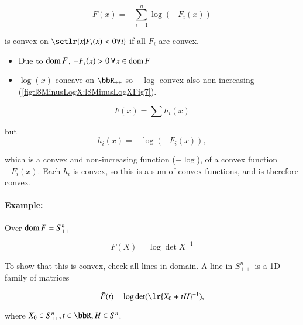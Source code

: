 \begin{equation}\label{eqn:convexOptimizationLecture8:300}
F(x) = - \sum_{i = 1}^n \log( -F_i(x) )
\end{equation}

is convex on \( \setlr{ x | F_i(x) < 0 \forall i } \) if all \( F_i \) are convex.

\begin{itemize}
\item Due to \( \operatorname{dom} F \), \( -F_i(x) > 0 \,\forall x \in \operatorname{dom} F \)
\item \( \log(x) \) concave on \( \bbR_{++} \) so \( -\log \) convex also non-increasing (\cref{fig:l8MinusLogX:l8MinusLogXFig7}).


\end{itemize}

\begin{dmath}\label{eqn:convexOptimizationLecture8:320}
F(x) = \sum h_i(x)
\end{dmath}

but
\begin{dmath}\label{eqn:convexOptimizationLecture8:340}
h_i(x) = -\log(-F_i(x)),
\end{dmath}

which is a convex and non-increasing function (\(-\log\)), of a convex function \( -F_i(x) \).  Each 
\( h_i \) is convex, so this is a sum of convex functions, and is therefore convex.

\paragraph{Example:}

Over \( \operatorname{dom} F = S^n_{++} \)

\begin{dmath}\label{eqn:convexOptimizationLecture8:360}
F(X) = \log \det X^{-1}
\end{dmath}

To show that this is convex, check all lines in domain.  A line in \( S^n_{++} \) is a 1D family of matrices

\begin{dmath}\label{eqn:convexOptimizationLecture8:380}
\tilde{F}(t) = \log \det( \lr{X_0 + t H}^{-1} ),
\end{dmath}

where \( X_0 \in S^n_{++}, t \in \bbR, H \in S^n \).

